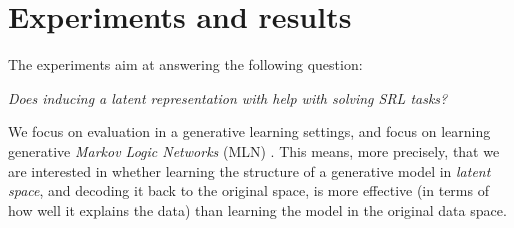





\section{Experiments and results}



The experiments aim at answering the following question:


\begin{displayquote}
\textit{Does inducing a latent  representation with  help with solving SRL tasks?}
\end{displayquote}

We focus on evaluation in a generative learning settings, and focus on learning generative \textit{Markov Logic Networks} (MLN) \cite{Richardson2006}.
This means, more precisely, that we are interested in whether learning the structure of a generative model in \textit{latent space}, and decoding it back to the original space, is more effective (in terms of how well it explains the data) than learning the model in the original data space.


